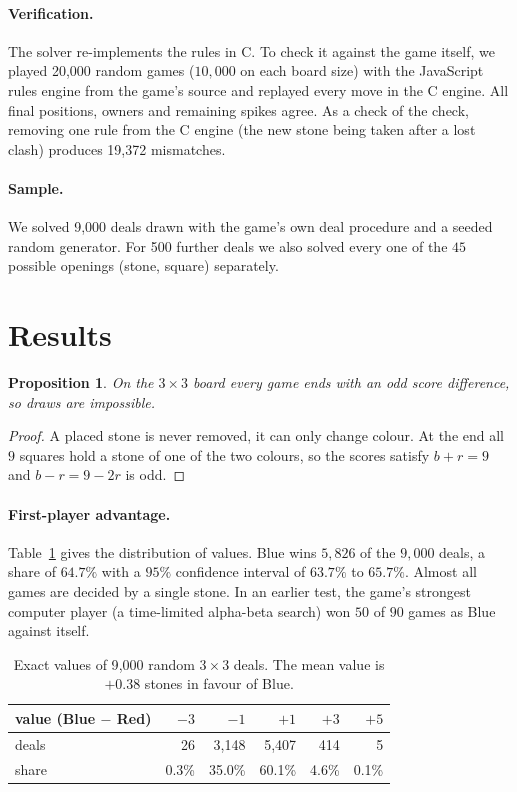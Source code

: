 \documentclass[11pt,a4paper]{article}
\newtheorem{proposition}{Proposition}
\begin{document}
\paragraph{Verification.} The solver re-implements the rules in C. To check it against the game itself, we played 20{,}000 random games ($10{,}000$ on each board size) with the JavaScript rules engine from the game's source and replayed every move in the C engine. All final positions, owners and remaining spikes agree. As a check of the check, removing one rule from the C engine (the new stone being taken after a lost clash) produces 19{,}372 mismatches.

\paragraph{Sample.} We solved 9{,}000 deals drawn with the game's own deal procedure and a seeded random generator. For 500 further deals we also solved every one of the $45$ possible openings (stone, square) separately.

\section{Results}

\begin{proposition}\label{prop:nodraw}
On the $3\times3$ board every game ends with an odd score difference, so draws are impossible.
\end{proposition}
\begin{proof}
A placed stone is never removed, it can only change colour. At the end all $9$ squares hold a stone of one of the two colours, so the scores satisfy $b + r = 9$ and $b - r = 9 - 2r$ is odd.
\end{proof}

\paragraph{First-player advantage.} Table~\ref{tab:values} gives the distribution of values. Blue wins $5{,}826$ of the $9{,}000$ deals, a share of $64.7\%$ with a $95\%$ confidence interval of $63.7\%$ to $65.7\%$. Almost all games are decided by a single stone. In an earlier test, the game's strongest computer player (a time-limited alpha-beta search) won $50$ of $90$ games as Blue against itself.

\begin{table}[ht]
\centering
\begin{tabular}{lrrrrr}
\toprule
value (Blue $-$ Red) & $-3$ & $-1$ & $+1$ & $+3$ & $+5$ \\
\midrule
deals & 26 & 3{,}148 & 5{,}407 & 414 & 5 \\
share & 0.3\% & 35.0\% & 60.1\% & 4.6\% & 0.1\% \\
\bottomrule
\end{tabular}
\caption{Exact values of 9{,}000 random $3\times3$ deals. The mean value is $+0.38$ stones in favour of Blue.}
\label{tab:values}
\end{table}
\end{document}
